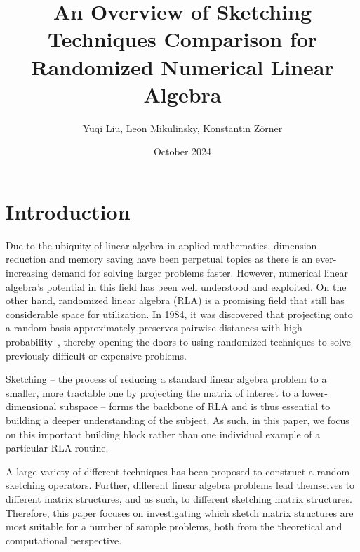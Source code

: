 \documentclass{article}
\title{An Overview of Sketching Techniques Comparison for Randomized Numerical Linear Algebra}
\author{Yuqi Liu, Leon Mikulinsky, Konstantin Zörner}
\date{October 2024}
\begin{document}
\maketitle

\section{Introduction}
Due to the ubiquity of linear algebra in applied mathematics, dimension reduction and memory saving have been  perpetual topics as there is an ever-increasing demand for solving larger problems faster. However, numerical linear algebra's potential in this field has been well understood and exploited. On the other hand, randomized linear algebra (RLA) is a promising field that still has considerable space for utilization. In 1984, it was discovered that projecting onto a random basis approximately preserves pairwise distances with high probability~\cite{beals1984conference}, thereby opening the doors to using randomized techniques to solve previously difficult or expensive problems.

Sketching -- the process of reducing a standard linear algebra problem to a smaller, more tractable one by projecting the matrix of interest to a lower-dimensional subspace --  forms the backbone of RLA and is thus essential to building a deeper understanding of the subject. As such, in this paper, we focus on this important building block rather than one individual example of a particular RLA routine. 

A large variety of different techniques has been proposed to construct a random sketching operators. Further, different linear algebra problems lead themselves to different matrix structures, and as such, to different sketching matrix structures. Therefore, this paper focuses on investigating which sketch matrix structures are most suitable for a number of sample problems, both from the theoretical and computational perspective.


\end{document}
